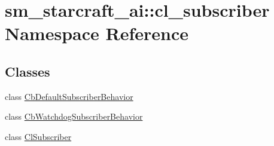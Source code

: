 \hypertarget{namespacesm__starcraft__ai_1_1cl__subscriber}{}\section{sm\+\_\+starcraft\+\_\+ai\+:\+:cl\+\_\+subscriber Namespace Reference}
\label{namespacesm__starcraft__ai_1_1cl__subscriber}
\subsection*{Classes}
\begin{DoxyCompactItemize}
\item 
class \hyperlink{classsm__starcraft__ai_1_1cl__subscriber_1_1CbDefaultSubscriberBehavior}{Cb\+Default\+Subscriber\+Behavior}
\item 
class \hyperlink{classsm__starcraft__ai_1_1cl__subscriber_1_1CbWatchdogSubscriberBehavior}{Cb\+Watchdog\+Subscriber\+Behavior}
\item 
class \hyperlink{classsm__starcraft__ai_1_1cl__subscriber_1_1ClSubscriber}{Cl\+Subscriber}
\end{DoxyCompactItemize}
